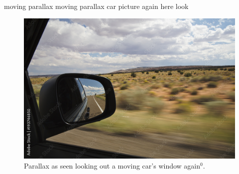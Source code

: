 \documentclass[12pt]{beamer}
\begin{document}
        \begin{frame}{moving parallax} \centering
            moving parallax car picture again here look
            \begin{figure}
                \includegraphics[scale=0.8, fbox, bb=0 0 240 160]{parallaxcar.jpeg}
                \caption{Parallax as seen looking out a moving car's window again$^0$.}
            \end{figure}
        \end{frame}
\end{document}
